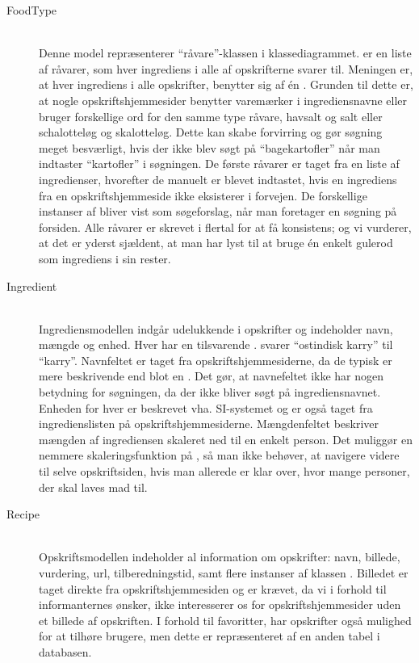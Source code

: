 \begin{description}

  \item[FoodType] \hfill \\
    Denne model repræsenterer ``råvare''-klassen i klassediagrammet.  er en liste af råvarer, som hver ingrediens i alle af opskrifterne svarer til. Meningen er, at hver ingrediens i alle opskrifter, benytter sig af én . Grunden til dette er, at nogle opskriftshjemmesider benytter varemærker i ingrediensnavne eller bruger forskellige ord for den samme type råvare, \fx havsalt og salt eller schalotteløg og skalotteløg. Dette kan skabe forvirring og gør søgning meget besværligt, hvis der ikke blev søgt på ``bagekartofler'' når man indtaster ``kartofler'' i søgningen. De første råvarer er taget fra en liste af ingredienser\cite{ingrediensliste}, hvorefter de manuelt er blevet indtastet, hvis en ingrediens fra en opskriftshjemmeside ikke eksisterer i forvejen. De forskellige instanser af  bliver \fx vist som søgeforslag, når man foretager en søgning på forsiden. Alle råvarer er skrevet i flertal for at få konsistens; og vi vurderer, at det er yderst sjældent, at man har lyst til \fx at bruge én enkelt gulerod som ingrediens i sin rester.

  \item[Ingredient] \hfill \\
    Ingrediensmodellen indgår udelukkende i opskrifter og indeholder navn, mængde og enhed. Hver  har en tilsvarende . \Fx svarer ``ostindisk karry'' til ``karry''. Navnfeltet er taget fra opskriftshjemmesiderne, da de typisk er mere beskrivende end blot en . Det gør, at navnefeltet ikke har nogen betydning for søgningen, da der ikke bliver søgt på ingrediensnavnet. Enheden for hver  er beskrevet vha. SI-systemet og er også taget fra ingredienslisten på opskriftshjemmesiderne. Mængdenfeltet beskriver mængden af ingrediensen skaleret ned til en enkelt person. Det muliggør en nemmere skaleringsfunktion på \Foodl{}, så man ikke behøver, at navigere videre til selve opskriftsiden, hvis man allerede er klar over, hvor mange personer, der skal laves mad til.

  \item[Recipe] \hfill \\
    Opskriftsmodellen indeholder al information om opskrifter: navn, billede, vurdering, url, tilberedningstid, samt flere instanser af klassen . Billedet er taget direkte fra opskriftshjemmesiden og er krævet, da vi i forhold til informanternes ønsker, ikke interesserer os for opskriftshjemmesider uden et billede af opskriften. I forhold til favoritter, har opskrifter også mulighed for at tilhøre brugere, men dette er repræsenteret af en anden tabel i databasen.  


\end{description}
